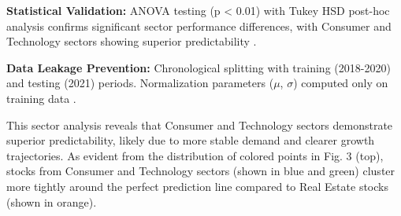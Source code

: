 \documentclass[3p,times,procedia]{elsarticle}
\begin{document}
\begin{table}[!ht]
\centering
\caption{\textbf{Sector-wise Average Performance Metrics}}
\end{table}

\textbf{Statistical Validation:} ANOVA testing (p < 0.01) with Tukey HSD post-hoc analysis confirms significant sector performance differences, with Consumer and Technology sectors showing superior predictability \cite{Box1970,Tukey1949}.

\textbf{Data Leakage Prevention:} Chronological splitting with training (2018-2020) and testing (2021) periods. Normalization parameters ($\mu$, $\sigma$) computed only on training data \cite{Fischer2018}.

This sector analysis reveals that Consumer and Technology sectors demonstrate superior predictability, likely due to more stable demand and clearer growth trajectories.
As evident from the distribution of colored points in Fig. 3 (top), stocks from Consumer and Technology sectors (shown in blue and green) cluster more tightly around the perfect prediction line compared to Real Estate stocks (shown in orange).

\end{document}
